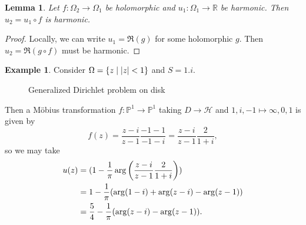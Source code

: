 \documentclass[leqno, openany]{memoir}
\newtheorem{lem}[thm]{Lemma}
\theoremstyle{definition}
\newtheorem{exm}[thm]{Example}
\theoremstyle{remark}
\theoremstyle{plain}
\theoremstyle{definition}
\theoremstyle{remark}
\newcommand{\R}{\mathbb{R}}
\renewcommand{\P}{\mathbb{P}}
\newcommand{\mc}[1]{\mathcal{#1}}
\begin{document}
\begin{lem}
    Let $f \colon \Omega_2 \to \Omega_1$ be holomorphic and $u_1 \colon \Omega_1 \to \R$ be harmonic. Then $u_2 = u_1 \circ f$ is harmonic.
\end{lem}

\begin{proof}
    Locally, we can write $u_1 = \Re(g)$ for some holomorphic $g$. Then $u_2 = \Re(g \circ f)$ must be harmonic.
\end{proof}

\begin{exm}
    Consider $\Omega = \qty{z \mid \abs{z} < 1}$ and $S = \qty{1, i}$.
    \begin{figure}[H]
    \begin{center}
    \end{center}
    \caption{Generalized Dirichlet problem on disk}%
    \label{fig:}
    \end{figure}
    Then a M\"obius transformation $f \colon \P^1 \to \P^1$ taking $D \to \mc{H}$ and $1, i, -1 \mapsto \infty, 0, 1$ is given by
    \[ f(z) = \frac{z-i}{z-1} \frac{-1-1}{-1-i} = \frac{z-i}{z-1} \frac{2}{1+i}, \]
    so we may take
    \begin{align*} 
        u(z) &= (1 - \frac{1}{\pi} \arg \qty(\frac{z-i}{z-1} \frac{2}{1+i})) \\ 
             &= 1 - \frac{1}{\pi} (\arg(1-i) + \arg(z-i) -\arg(z-1)) \\ 
             &= \frac{5}{4} - \frac{1}{\pi} (\arg(z-i) - \arg(z-1)). 
    \end{align*}
\end{exm}
\end{document}
